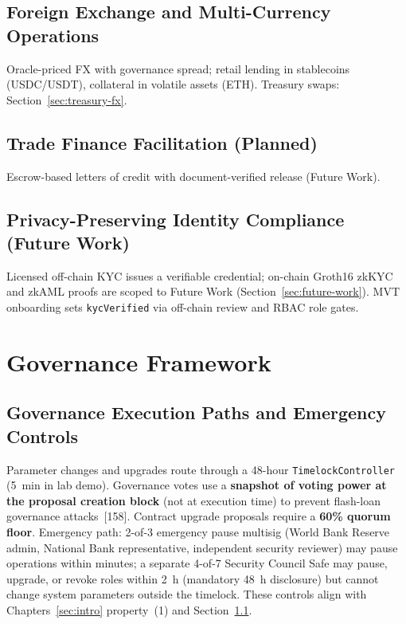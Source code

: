 \documentclass[12pt,a4paper]{report}
\begin{document}
\subsection{Foreign Exchange and Multi-Currency Operations}
Oracle-priced FX with governance spread; retail lending in stablecoins (USDC/USDT), collateral in volatile assets (ETH). Treasury swaps: Section~\ref{sec:treasury-fx}.

\subsection{Trade Finance Facilitation (Planned)}
Escrow-based letters of credit with document-verified release (Future Work).

\subsection{Privacy-Preserving Identity Compliance (Future Work)}
\label{sec:zkp-compliance}
Licensed off-chain KYC issues a verifiable credential; on-chain Groth16 zkKYC and zkAML proofs are scoped to Future Work (Section~\ref{sec:future-work}). MVT onboarding sets \texttt{kycVerified} via off-chain review and RBAC role gates.


\section{Governance Framework}
\label{sec:governance-framework}

\subsection{Governance Execution Paths and Emergency Controls}
\label{sec:governance-dual-path}

Parameter changes and upgrades route through a 48-hour \texttt{TimelockController} (5~min in lab demo). Governance votes use a \textbf{snapshot of voting power at the proposal creation block} (not at execution time) to prevent flash-loan governance attacks~[158]. Contract upgrade proposals require a \textbf{60\% quorum floor}. Emergency path: 2-of-3 emergency pause multisig (World Bank Reserve admin, National Bank representative, independent security reviewer) may pause operations within minutes; a separate 4-of-7 Security Council Safe may pause, upgrade, or revoke roles within 2~h (mandatory 48~h disclosure) but cannot change system parameters outside the timelock. These controls align with Chapters~\ref{sec:intro} property~(1) and Section~\ref{sec:governance-dual-path}.
\end{document}
